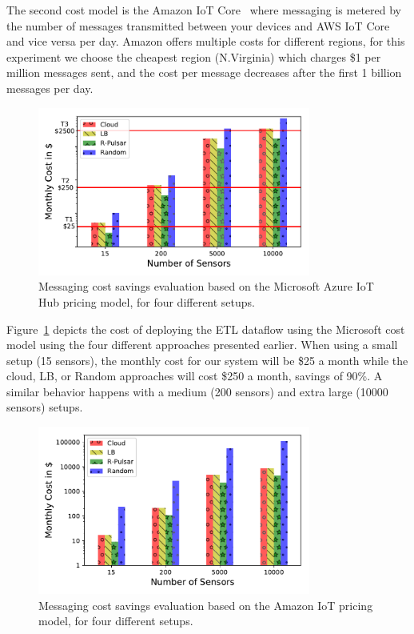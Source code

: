The second cost model is the Amazon IoT Core~\cite{AWSPricing} where messaging is metered by the number of messages transmitted between your devices and AWS IoT Core and vice versa per day. Amazon offers multiple costs for different regions, for this experiment we choose the cheapest region (N.Virginia) which charges \$1 per million messages sent, and the cost per message decreases after the first 1 billion messages per day.

\begin{figure}[h!]
  \centering
  \includegraphics[width=0.8\textwidth]{Results/Cost_Microsoft.pdf}
  \caption{Messaging cost savings evaluation based on the Microsoft Azure IoT Hub pricing model, for four different setups.}
  \label{fig:cost-microsoft}
\end{figure} 


Figure~\ref{fig:cost-microsoft} depicts the cost of deploying the ETL dataflow using the Microsoft cost model using the four different approaches presented earlier. When using a small setup (15 sensors), the monthly cost for our system will be \$25 a month while the cloud, LB, or Random approaches will cost \$250 a month, savings of 90\%. A similar behavior happens with a medium (200 sensors) and extra large (10000 sensors) setups. 

\begin{figure}[h!]
  \centering
  \includegraphics[width=0.8\textwidth]{Results/Cost_Amazon.pdf}
  \caption{Messaging cost savings evaluation based on the Amazon IoT pricing model, for four different setups.}
  \label{fig:cost-amazon}
\end{figure} 


